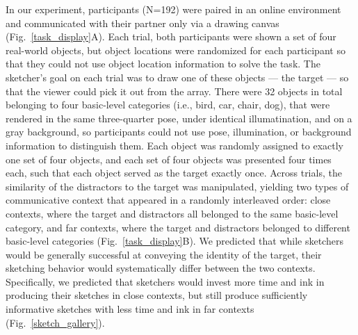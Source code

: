 \documentclass[9pt,twocolumn,twoside]{pnas-new}
\begin{document}
In our experiment, participants (N=192) were paired in an online environment and communicated with their partner only via a drawing canvas (Fig.~\ref{task_display}A). 
Each trial, both participants were shown a set of four real-world objects, but object locations were randomized for each participant so that they could not use object location information to solve the task. 
The sketcher's goal on each trial was to draw one of these objects --- the target --- so that the viewer could pick it out from the array. 
There were 32 objects in total belonging to four basic-level categories (i.e., bird, car, chair, dog), that were rendered in the same three-quarter pose, under identical illumatination, and on a gray background, so participants could not use pose, illumination, or background information to distinguish them. 
Each object was randomly assigned to exactly one set of four objects, and each set of four objects was presented four times each, such that each object served as the target exactly once. 
Across trials, the similarity of the distractors to the target was manipulated, yielding two types of communicative context that appeared in a randomly interleaved order: close contexts, where the target and distractors all belonged to the same basic-level category, and far contexts, where the target and distractors belonged to different basic-level categories (Fig.~\ref{task_display}B). 
We predicted that while sketchers would be generally successful at conveying the identity of the target, their sketching behavior would systematically differ between the two contexts. 
Specifically, we predicted that sketchers would invest more time and ink in producing their sketches in close contexts, but still produce sufficiently informative sketches with less time and ink in far contexts (Fig.~\ref{sketch_gallery}). 

\end{document}
